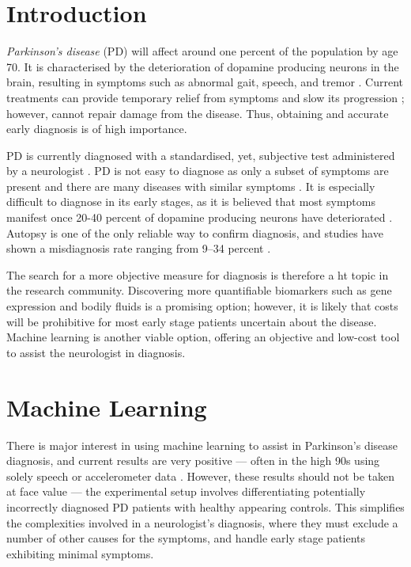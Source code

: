 \documentclass{article}
\begin{document}
\section{Introduction}
\label{introduction}
\emph{Parkinson's disease} (PD) will affect around one percent of the population by age 70. It is characterised by the deterioration of dopamine producing neurons in the brain, resulting in symptoms such as abnormal gait, speech, and tremor \cite{savittdiagnosis1}. Current treatments can provide temporary relief from symptoms and slow its progression \cite{slowprog3}; however, cannot repair damage from the disease. Thus, obtaining and accurate early diagnosis is of high importance.

PD is currently diagnosed with a standardised, yet, subjective test administered by a neurologist \cite{tolosadiagnosis26}. PD is not easy to diagnose as only a subset of symptoms are present \cite{thenganatt2014parkinsonsubtypes} and there are many diseases with similar symptoms \cite{parkinsonismdifferential1}. It is especially difficult to diagnose in its early stages, as it is believed that most symptoms manifest once 20-40 percent of dopamine producing neurons have deteriorated \cite{brooksdiagnosis25}. Autopsy is one of the only reliable way to confirm diagnosis, and studies have shown a misdiagnosis rate ranging from 9--34 percent \cite{tolosadiagnosis26, brooksdiagnosis25, jankovic2000evolution}. 

The search for a more objective measure for diagnosis is therefore a ht topic in the research community. Discovering more quantifiable biomarkers such as gene expression \cite{genemarkers} and bodily fluids \cite{biomarkerfluid} is a promising option; however, it is likely that costs will be prohibitive for most early stage patients uncertain about the disease. Machine learning is another viable option, offering an objective and low-cost tool to assist the neurologist in diagnosis.


\section{Machine Learning}
\label{mlpd}
There is major interest in using machine learning to assist in Parkinson's disease diagnosis, and current results are very positive --- often in the high 90s using solely speech or accelerometer data \cite{tsanas2012novel, arora2014high}. However, these results should not be taken at face value --- the experimental setup involves differentiating potentially incorrectly diagnosed PD patients with healthy appearing controls. This simplifies the complexities involved in a neurologist's diagnosis, where they must exclude a number of other causes for the symptoms, and handle early stage patients exhibiting minimal symptoms. 
\end{document}
